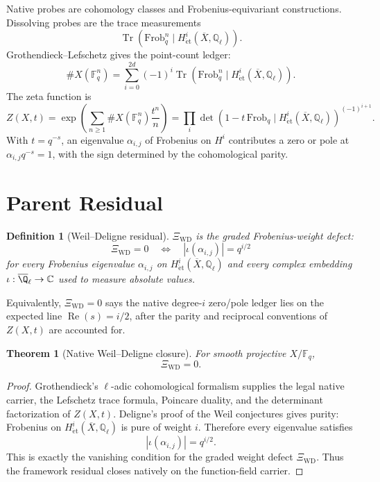 \documentclass[11pt]{article}
\newtheorem{definition}{Definition}
\newtheorem{theorem}{Theorem}
\newcommand{\Fq}{\mathbb F_q}
\newcommand{\Qell}{\mathbb Q_\ell}
\newcommand{\Xbar}{\overline X}
\newcommand{\XiWD}{\Xi_{\mathrm{WD}}}
\begin{document}
Native probes are cohomology classes and Frobenius-equivariant constructions.
Dissolving probes are the trace measurements
\[
\operatorname{Tr}\!\left(\mathrm{Frob}_q^n\mid
H^i_{\mathrm{\acute et}}(\Xbar,\Qell)\right).
\]
Grothendieck--Lefschetz gives the point-count ledger:
\[
\#X(\Fq^n)
=
\sum_{i=0}^{2d}(-1)^i
\operatorname{Tr}\!\left(\mathrm{Frob}_q^n\mid
H^i_{\mathrm{\acute et}}(\Xbar,\Qell)\right).
\]
The zeta function is
\[
Z(X,t)
=
\exp\left(\sum_{n\ge1}\#X(\Fq^n)\frac{t^n}{n}\right)
=
\prod_i
\det\!\left(1-t\,\mathrm{Frob}_q\mid
H^i_{\mathrm{\acute et}}(\Xbar,\Qell)\right)^{(-1)^{i+1}}.
\]
With \(t=q^{-s}\), an eigenvalue \(\alpha_{i,j}\) of Frobenius on \(H^i\)
contributes a zero or pole at \(\alpha_{i,j}q^{-s}=1\), with the sign
determined by the cohomological parity.

\section*{Parent Residual}

\begin{definition}[Weil--Deligne residual]
\(\XiWD\) is the graded Frobenius-weight defect:
\[
\XiWD=0
\quad\Longleftrightarrow\quad
|\iota(\alpha_{i,j})|=q^{i/2}
\]
for every Frobenius eigenvalue \(\alpha_{i,j}\) on
\(H^i_{\mathrm{\acute et}}(\Xbar,\Qell)\) and every complex embedding
\(\iota:\overline{\Q}_\ell\to\mathbb C\) used to measure absolute values.
\end{definition}

Equivalently, \(\XiWD=0\) says the native degree-\(i\) zero/pole ledger lies
on the expected line \(\operatorname{Re}(s)=i/2\), after the parity and
reciprocal conventions of \(Z(X,t)\) are accounted for.

\begin{theorem}[Native Weil--Deligne closure]
For smooth projective \(X/\Fq\),
\[
\XiWD=0.
\]
\end{theorem}

\begin{proof}
Grothendieck's \(\ell\)-adic cohomological formalism supplies the legal native
carrier, the Lefschetz trace formula, Poincare duality, and the determinant
factorization of \(Z(X,t)\).  Deligne's proof of the Weil conjectures gives
purity: Frobenius on \(H^i_{\mathrm{\acute et}}(\Xbar,\Qell)\) is pure of
weight \(i\).  Therefore every eigenvalue satisfies
\[
|\iota(\alpha_{i,j})|=q^{i/2}.
\]
This is exactly the vanishing condition for the graded weight defect
\(\XiWD\).  Thus the framework residual closes natively on the
function-field carrier.
\end{proof}
\end{document}
